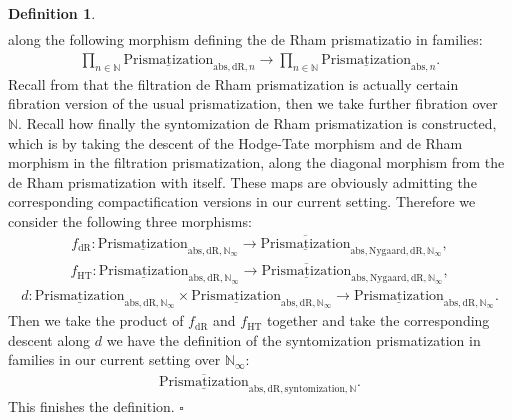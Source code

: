\documentclass[12pt]{article}
\theoremstyle{definition}
\newtheorem{definition}{Definition}
\begin{document}
\begin{definition}
\begin{align}
\end{align}
along the following morphism defining the de Rham prismatizatio in families:
\begin{align}
\prod_{n\in \mathbb{N}} {\underline{\mathrm{Prismatization}}}_{\mathrm{abs},\mathrm{dR},n}\rightarrow  \prod_{n\in \mathbb{N}} {\underline{\mathrm{Prismatization}}}_{\mathrm{abs},n}.
\end{align}
Recall from \cite{3D} that the filtration de Rham prismatization is actually certain fibration version of the usual prismatization, then we take further fibration over $\mathbb{N}$. Recall how finally the syntomization de Rham prismatization is constructed, which is by taking the descent of the Hodge-Tate morphism and de Rham morphism in the filtration prismatization, along the diagonal morphism from the de Rham prismatization with itself. These maps are obviously admitting the corresponding compactification versions in our current setting. Therefore we consider the following three morphisms:
\begin{align}
f_\mathrm{dR}: {\underline{\mathrm{Prismatization}}}_{\mathrm{abs},\mathrm{dR},\mathbb{N}_\infty}\rightarrow \overline{\underline{\mathrm{Prismatization}}}_{\mathrm{abs},\mathrm{Nygaard},\mathrm{dR},\mathbb{N}_\infty},
\end{align}
\begin{align}
f_\mathrm{HT}: {\underline{\mathrm{Prismatization}}}_{\mathrm{abs},\mathrm{dR},\mathbb{N}_\infty}\rightarrow \overline{\underline{\mathrm{Prismatization}}}_{\mathrm{abs},\mathrm{Nygaard},\mathrm{dR},\mathbb{N}_\infty},
\end{align}
\begin{align}
d:  {\underline{\mathrm{Prismatization}}}_{\mathrm{abs},\mathrm{dR},\mathbb{N}_\infty}\times {\underline{\mathrm{Prismatization}}}_{\mathrm{abs},\mathrm{dR},\mathbb{N}_\infty} \rightarrow {\underline{\mathrm{Prismatization}}}_{\mathrm{abs},\mathrm{dR},\mathbb{N}_\infty}.
\end{align}
Then we take the product of $f_\mathrm{dR}$ and $f_\mathrm{HT}$ together and take the corresponding descent along $d$ we have the definition of the syntomization prismatization in families in our current setting over $\mathbb{N}_\infty$:
\begin{align}
\overline{\underline{\mathrm{Prismatization}}}_{\mathrm{abs},\mathrm{dR},\mathrm{syntomization},\mathbb{N}}. 
\end{align}
This finishes the definition. $\square$
\end{definition}
\end{document}
